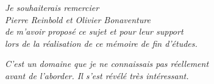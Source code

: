 \pagestyle{empty} %

\cleardoublepage

\null\vfill %

\begin{flushright}
\emph{Je souhaiterais remercier\\Pierre Reinbold et Olivier Bonaventure\\de m'avoir proposé ce sujet et pour leur support\\lors de la réalisation de ce mémoire de fin d'études.}
\end{flushright}

\begin{flushright}
\emph{C'est un domaine que je ne connaissais pas réellement\\avant de l'aborder. Il s'est révélé très intéressant.}
\end{flushright}

\vfill\vfill\vfill\vfill\vfill\null %

\cleardoublepage
